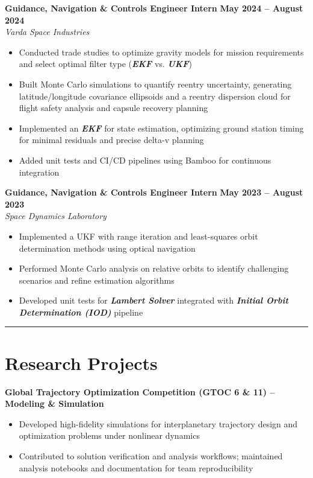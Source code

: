 \documentclass[10pt]{article}
\newcommand{\sectionline}{\noindent\rule{\linewidth}{0.4pt}}
\begin{document}
	\textbf{Guidance, Navigation \& Controls Engineer Intern} \hfill \textbf{May 2024 – August 2024} \\
	\emph{Varda Space Industries}
	\begin{itemize}
		\item Conducted trade studies to optimize gravity models for mission requirements and select optimal filter type (\textbf{\emph{EKF}} vs. \textbf{\emph{UKF}})
		\item Built Monte Carlo simulations to quantify reentry uncertainty, generating latitude/longitude covariance ellipsoids and a reentry dispersion cloud for flight safety analysis and capsule recovery planning
		\item Implemented an \textbf{\emph{EKF}} for state estimation, optimizing ground station timing for minimal residuals and precise delta-v planning
		\item Added unit tests and CI/CD pipelines using Bamboo for continuous integration
	\end{itemize}
	
	\textbf{Guidance, Navigation \& Controls Engineer Intern} \hfill \textbf{May 2023 – August 2023} \\
	\emph{Space Dynamics Laboratory}
	\begin{itemize}
		\item Implemented a UKF with range iteration and least-squares orbit determination methods using optical navigation
		\item Performed Monte Carlo analysis on relative orbits to identify challenging scenarios and refine estimation algorithms
		\item Developed unit tests for \textbf{\emph{Lambert Solver}} integrated with \textbf{\emph{Initial Orbit Determination (IOD)}} pipeline
	\end{itemize}
	
	\newpage
	
	\sectionline
	
	\section*{Research Projects}
	
	\textbf{Global Trajectory Optimization Competition (GTOC 6 \& 11) – Modeling \& Simulation} 
	\begin{itemize}
		\item Developed high-fidelity simulations for interplanetary trajectory design and optimization problems under nonlinear dynamics
		    \item Contributed to solution verification and analysis workflows; maintained analysis notebooks and documentation for team reproducibility
	\end{itemize}
	
\end{document}
